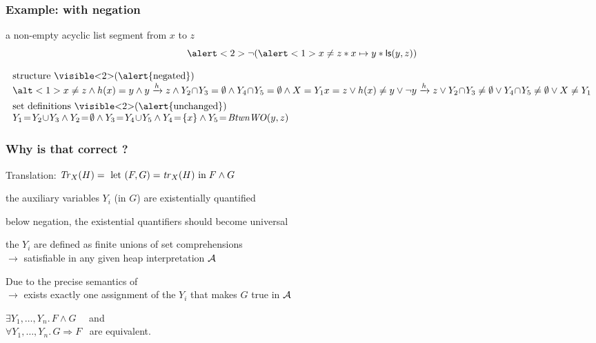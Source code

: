 \documentclass{beamer}
\begin{document}
\begin{frame}[2]
  \frametitle{Example: with negation}
a non-empty acyclic list segment from $x$ to $z$
\[ \alert<2>{\neg} ( \alert<1>{x \neq z* x \mapsto y * \liste{y}{z}} ) \]

\[
\begin{array}{l}
\text{structure \visible<2>{(\alert{negated})}}\\
\alt<1>{
x \neq z \land \edge(x)=y \land \reach{y}{z} \land
Y_2\!\cap\!Y_3 = \emptyset \land
Y_4\!\cap\!Y_5 = \emptyset \land
X = Y_1
}{
x = z \lor \edge(x) \neq y \lor \neg\reach{y}{z} \lor
Y_2\!\cap\!Y_3 \neq \emptyset \lor
Y_4\!\cap\!Y_5 \neq \emptyset \lor
X \neq Y_1
}\\[1ex]

\text{set definitions \visible<2>{(\alert{unchanged})}}\\
Y_1\!=\!Y_2\!\cup\!Y_3 \land
Y_2\!=\!\emptyset \land
Y_3\!=\!Y_4\!\cup\!Y_5 \land %
Y_4\!=\!\{x\} \land
Y_5\!=\!\BtwnWO(y,z)
\end{array}
\]
\end{frame}

\begin{frame}
  \frametitle{Why is that correct ?}
    
Translation: $\trfull{H}{X} = \ \letin{(F,G)}{\tr_X(H)} \; F \land G$

\vspace{2ex}

the auxiliary variables \alert{$Y_i$} (in $G$) \alert{are existentially quantified}

\vspace{1ex}

below negation, the existential quantifiers should become universal

\vspace{2ex}

the $Y_i$ are defined as finite unions of set comprehensions\\
$\rightarrow$ \alert{satisfiable in any given heap interpretation $\alg$}

\vspace{2ex}

Due to the precise semantics of \JoshLogic\\
$\rightarrow$ \alert{exists exactly one assignment of the $Y_i$} that makes $G$ true in $\alg$

\vspace{1ex}

$\exists Y_1,\dots,Y_n.\, F \land G$ \ \  and\\
$\forall Y_1,\dots,Y_n.\, G \Rightarrow F$ \ are equivalent. 

\end{frame}
\end{document}
